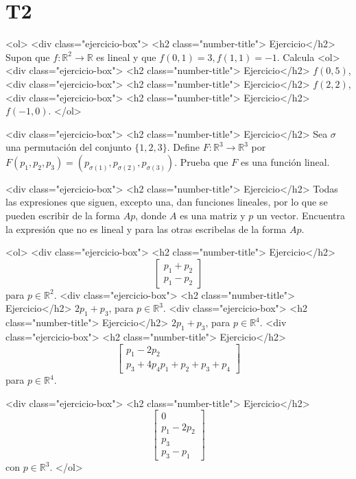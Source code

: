 \documentclass{article}
\theoremstyle{definition}
\begin{document}
  \section*{T2}
  
  <ol>
       <div class="ejercicio-box"> <h2 class="number-title"> Ejercicio</h2> Supon que $f:\mathbb{R}^2 \to \mathbb{R}$ es lineal y que $f(0,1)=3, f(1,1)=-1$. Calcula
       <ol>
       <div class="ejercicio-box"> <h2 class="number-title"> Ejercicio</h2> $f(0,5)$,
       <div class="ejercicio-box"> <h2 class="number-title"> Ejercicio</h2> $f(2,2)$,
         <div class="ejercicio-box"> <h2 class="number-title"> Ejercicio</h2> $f(-1,0)$.
       </ol>

       <div class="ejercicio-box"> <h2 class="number-title"> Ejercicio</h2> Sea $\sigma$ una permutación del conjunto $\{1,2,3\}$. Define $F:\mathbb{R}^3\to \mathbb{R}^3$ por
  $F(p_1,p_2,p_3)=(p_{\sigma(1)}, p_{\sigma(2)}, p_{\sigma(3)})$. Prueba que $F$ es una función lineal.


       <div class="ejercicio-box"> <h2 class="number-title"> Ejercicio</h2> Todas las expresiones que siguen, excepto una, dan funciones lineales, por lo que se pueden escribir de la forma $Ap$, donde $A$ es una matriz y $p$ un vector. Encuentra la expresión que no es lineal y para las otras  escribelas  de la forma $Ap$.

       
       <ol>
       <div class="ejercicio-box"> <h2 class="number-title"> Ejercicio</h2> 
       $$
       \left[
       \begin{array}{cc}
       p_1+p_2 \\
       p_1-p_2
       \end{array}
       \right]	
       $$
       para $p\in \mathbb{R}^2$.
       <div class="ejercicio-box"> <h2 class="number-title"> Ejercicio</h2> $2p_1+p_3$, para  $p\in \mathbb{R}^3$.
       <div class="ejercicio-box"> <h2 class="number-title"> Ejercicio</h2> $2p_1+p_3$, para $p\in \mathbb{R}^4$.
       <div class="ejercicio-box"> <h2 class="number-title"> Ejercicio</h2> 
       $$
       \left[
       \begin{array}{c}
       p_1-2p_2 \\
       p_3+4p_4
       p_1+p_2+p_3+p_4
       \end{array}
       \right]
       $$
       para $p\in \mathbb{R}^4$.
       
	<div class="ejercicio-box"> <h2 class="number-title"> Ejercicio</h2> 
	$$
	\left[
	\begin{array}{c}
	0 \\
	p_1-2p_2\\
	p_3 \\
	p_3-p_1
	\end{array}
	\right]
	$$       
       con $p\in\mathbb{R}^3$.
       </ol>
\end{document}
